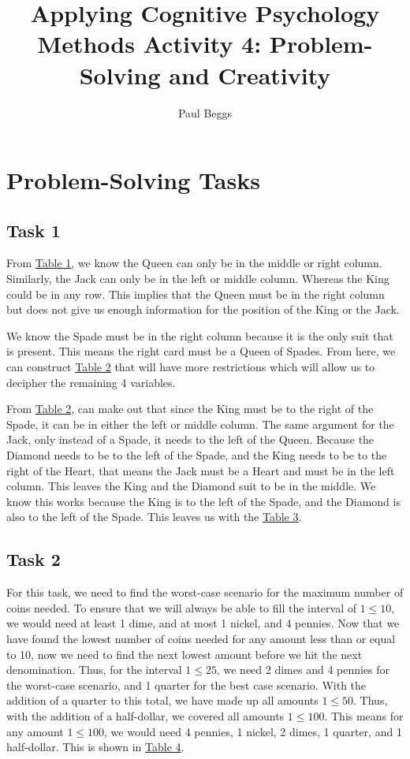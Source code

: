 \documentclass[stu,12pt,floatsintext]{apa7}
\title{Applying Cognitive Psychology Methods Activity 4: Problem-Solving and Creativity} %
\author{Paul Beggs}
\begin{document}
\maketitle 

\section{Problem-Solving Tasks}

\subsection{Task 1}


From \hyperref[tab:table1]{Table 1}, we know the Queen can only be in the middle or right column. Similarly, the Jack can only be in the left or middle column. Whereas the King could be in any row. This implies that the Queen must be in the right column but does not give us enough information for the position of the King or the Jack.

We know the Spade must be in the right column because it is the only suit that is present. This means the right card must be a Queen of Spades. From here, we can construct \hyperref[tab:table2]{Table 2} that will have more restrictions which will allow us to decipher the remaining 4 variables. 

From \hyperref[tab:table2]{Table 2}, can make out that since the King must be to the right of the Spade, it can be in either the left or middle column. The same argument for the Jack, only instead of a Spade, it needs to the left of the Queen. Because the Diamond needs to be to the left of the Spade, and the King needs to be to the right of the Heart, that means the Jack must be a Heart and must be in the left column. This leaves the King and the Diamond suit to be in the middle. We know this works because the King is to the left of the Spade, and the Diamond is also to the left of the Spade. This leaves us with the \hyperref[tab:table3]{Table 3}.

\subsection{Task 2}

For this task, we need to find the worst-case scenario for the maximum number of coins needed. To ensure that we will always be able to fill the interval of \(1 \leq 10\), we would need at least 1 dime, and at most 1 nickel, and 4 pennies. Now that we have found the lowest number of coins needed for any amount less than or equal to 10, now we need to find the next lowest amount before we hit the next denomination. Thus, for the interval \(1 \leq 25\), we need 2 dimes and 4 pennies for the worst-case scenario, and 1 quarter for the best case scenario. With the addition of a quarter to this total, we have made up all amounts \(1 \leq 50\). Thus, with the addition of a half-dollar, we covered all amounts \(1 \leq 100\). This means for any amount \(1 \leq 100\), we would need 4 pennies, 1 nickel, 2 dimes, 1 quarter, and 1 half-dollar. This is shown in \hyperref[tab:table4]{Table 4}.
\end{document}
